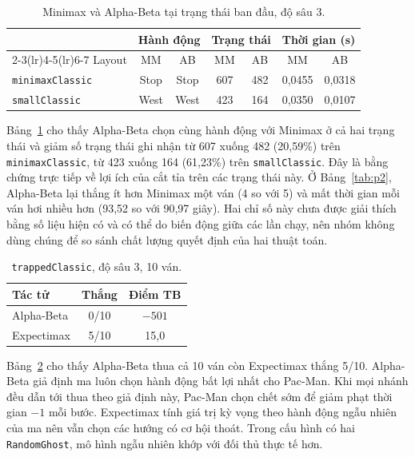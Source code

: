 \documentclass[conference]{IEEEtran}
\begin{document}
\begin{table}[!ht]
    \centering
    \scriptsize
    \setlength{\tabcolsep}{3pt}
    \caption{Minimax và Alpha-Beta tại trạng thái ban đầu, độ sâu 3.}
    \label{tab:mmab}
    \begin{tabular}{lcccccc}
    \toprule
    & \multicolumn{2}{c}{Hành động} & \multicolumn{2}{c}{Trạng thái} & \multicolumn{2}{c}{Thời gian (s)} \\
    \cmidrule(lr){2-3}\cmidrule(lr){4-5}\cmidrule(lr){6-7}
    Layout & MM & AB & MM & AB & MM & AB \\
    \midrule
    \texttt{minimaxClassic} & Stop & Stop & 607 & 482 & 0,0455 & 0,0318 \\
    \texttt{smallClassic} & West & West & 423 & 164 & 0,0350 & 0,0107 \\
    \bottomrule
    \end{tabular}
\end{table}

Bảng~\ref{tab:mmab} cho thấy Alpha-Beta chọn cùng hành động với Minimax ở cả hai trạng thái và giảm số trạng thái ghi nhận từ 607 xuống 482 (20,59\%) trên \texttt{minimaxClassic}, từ 423 xuống 164 (61,23\%) trên \texttt{smallClassic}. Đây là bằng chứng trực tiếp về lợi ích của cắt tỉa trên các trạng thái này. Ở Bảng~\ref{tab:p2}, Alpha-Beta lại thắng ít hơn Minimax một ván (4 so với 5) và mất thời gian mỗi ván hơi nhiều hơn (93,52 so với 90,97 giây). Hai chỉ số này chưa được giải thích bằng số liệu hiện có và có thể do biến động giữa các lần chạy, nên nhóm không dùng chúng để so sánh chất lượng quyết định của hai thuật toán.

\begin{table}[!ht]
    \centering
    \scriptsize
    \setlength{\tabcolsep}{4pt}
    \caption{\texttt{trappedClassic}, độ sâu 3, 10 ván.}
    \label{tab:trap}
    \begin{tabular}{lcc}
    \toprule
    Tác tử & Thắng & Điểm TB \\
    \midrule
    Alpha-Beta & 0/10 & $-501$ \\
    Expectimax & 5/10 & 15,0 \\
    \bottomrule
    \end{tabular}
\end{table}

Bảng~\ref{tab:trap} cho thấy Alpha-Beta thua cả 10 ván còn Expectimax thắng 5/10. Alpha-Beta giả định ma luôn chọn hành động bất lợi nhất cho Pac-Man. Khi mọi nhánh đều dẫn tới thua theo giả định này, Pac-Man chọn chết sớm để giảm phạt thời gian $-1$ mỗi bước. Expectimax tính giá trị kỳ vọng theo hành động ngẫu nhiên của ma nên vẫn chọn các hướng có cơ hội thoát. Trong cấu hình có hai \texttt{RandomGhost}, mô hình ngẫu nhiên khớp với đối thủ thực tế hơn.
\end{document}
